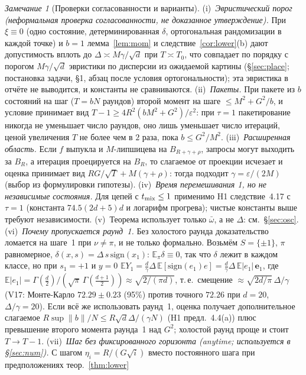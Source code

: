 \documentclass[11pt,a4paper]{article}
\numberwithin{equation}{section}
\theoremstyle{definition}
\theoremstyle{remark}
\newtheorem{remark}[theorem]{Замечание}
\newcommand{\E}{\mathbb E}\newcommand{\R}{\mathbb R}\newcommand{\Z}{\mathbb Z}\let\Prob\relax\newcommand{\Prob}{\mathbb P}
\newcommand{\norm}[1]{\lVert #1\rVert}\newcommand{\abs}[1]{\lvert #1\rvert}\newcommand{\ip}[2]{\langle #1,#2\rangle}
\newcommand{\wbar}{\bar\omega}\newcommand{\Atwo}{\cA^{\rm 2pt}_\gamma}
\begin{document}
\begin{remark}[Проверки согласованности и варианты]\label{rem:lower}
(i)~\emph{Эвристический порог (неформальная проверка согласованности, не доказанное утверждение).} При $\xi\equiv0$ (одно состояние, детерминированная $\delta$, ортогональная рандомизации в каждой точке) и $b=1$ лемма~\ref{lem:mom} и следствие~\ref{cor:lower}(b) дают допустимость вплоть до $\Delta\asymp M\gamma/\sqrt d$ при $T\asymp T_0$, что совпадает по порядку с порогом $M\gamma/\sqrt d$ эвристики по дисперсии из ожидаемой картины (\S\ref{sec:place}; постановка задачи, \S1, абзац после условия ортогональности); эта эвристика в отчёте не выводится, и константы не сравниваются. (ii)~\emph{Пакеты.} При пакете из $b$ состояний на шаг ($T=bN$ раундов) второй момент на шаге $\le M^2+G^2/b$, и условие принимает вид $T-1\ge4R^2(bM^2+G^2)/\varepsilon^2$: при $\tau=1$ пакетирование никогда не уменьшает число раундов, оно лишь уменьшает число итераций, ценой увеличения $T$ не более чем в $2$ раза, пока $b\le G^2/M^2$. (iii)~\emph{Расширенная область.} Если $f$ выпукла и $M$-липшицева на $B_{R+\gamma+\rho}$, запросы могут выходить за $B_R$, а итерация проецируется на $B_R$, то слагаемое от проекции исчезает и оценка принимает вид $RG/\sqrt T+M(\gamma+\rho)$: тогда подходит $\gamma=\varepsilon/(2M)$ (выбор из формулировки гипотезы). (iv)~\emph{Время перемешивания 1, но не независимые состояния.} Для цепей с $t_{\rm mix}\le1$ применимо H1 следствие~4.17 с $\tau=1$ (константа $74.5(2d+5)d$ и логарифм прогрева); чистые константы выше требуют независимости. (v)~Теорема использует только $\wbar$, а не $\Delta$: см.\ \S\ref{sec:osc}.
(vi)~\emph{Почему пропускается раунд~1.} Без холостого раунда доказательство ломается на шаге~1 при $\nu\ne\pi$, и не только формально. Возьмём $S=\{\pm1\}$, $\pi$ равномерное, $\delta(x,s)=\Delta\,s\,\mathrm{sign}(x_1)$: $\E_\pi\delta\equiv0$, так что $\delta$ лежит в каждом классе, но при $s_1=+1$ и $y=0$ $\E Y_1=\frac d\gamma\Delta\,\E[\mathrm{sign}(e_1)e]=\frac d\gamma\Delta\,\E\abs{e_1}\,\mathbf e_1$, где $\E\abs{e_1}=\Gamma(\frac d2)/(\sqrt\pi\,\Gamma(\frac{d+1}2))\approx\sqrt{2/(\pi d)}$, т.\,е.\ смещение $\approx\sqrt{2d/\pi}\,\Delta/\gamma$ (V17: Монте-Карло $72.29\pm0.23$ (95\%) против точного $72.26$ при $d=20$, $\Delta/\gamma=20$). Если всё же использовать раунд~1, оценка получает дополнительное слагаемое $R\sup\norm b/N\le R\sqrt d\Delta/(\gamma N)$ (H1 предл.~4.4(a)) плюс превышение второго момента раунда~1 над $G^2$; холостой раунд проще и стоит $T\to T-1$.
(vii)~\emph{Шаг без фиксированного горизонта (anytime; используется в \S\ref{sec:num}).} С шагом $\eta_i=R/(G\sqrt i)$ вместо постоянного шага при предположениях теор.~\ref{thm:lower}

\end{remark}
\end{document}
